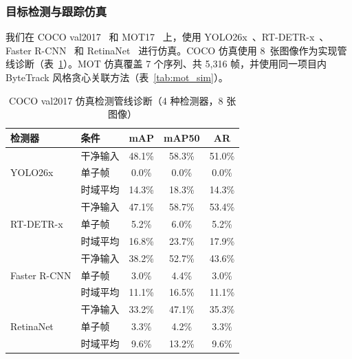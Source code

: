 \documentclass{ieeeaccess}
\begin{document}
\subsubsection{目标检测与跟踪仿真}

我们在 COCO val2017~\cite{b_coco2014} 和 MOT17~\cite{b_mot16} 上，使用 YOLO26x~\cite{b_yolo26}、RT-DETR-x~\cite{b_rtdetr2024}、Faster R-CNN~\cite{b_fasterrcnn2015} 和 RetinaNet~\cite{b_retinanet2017} 进行仿真。COCO 仿真使用 8~张图像作为实现管线诊断（表~\ref{tab:coco_sim}）。MOT 仿真覆盖 7 个序列、共 5,316 帧，并使用同一项目内 ByteTrack 风格贪心关联方法（表~\ref{tab:mot_sim}）。

\begin{table}[!t]
\caption{COCO val2017 仿真检测管线诊断（4 种检测器，8 张图像）}
\label{tab:coco_sim}
\centering
\footnotesize
\setlength{\tabcolsep}{5.8pt}
\begin{tabular}{llccc}
\toprule
检测器 & 条件 & mAP & mAP50 & AR \\
\midrule
\multirow{3}{*}{YOLO26x}
 & 干净输入 & 48.1\% & 58.3\% & 51.0\% \\
 & 单子帧 & 0.0\% & 0.0\% & 0.0\% \\
 & 时域平均 & 14.3\% & 18.3\% & 14.3\% \\
\midrule
\multirow{3}{*}{RT-DETR-x}
 & 干净输入 & 47.1\% & 58.7\% & 53.4\% \\
 & 单子帧 & 5.2\% & 6.0\% & 5.2\% \\
 & 时域平均 & 16.8\% & 23.7\% & 17.9\% \\
\midrule
\multirow{3}{*}{Faster R-CNN}
 & 干净输入 & 38.2\% & 52.7\% & 43.6\% \\
 & 单子帧 & 3.0\% & 4.4\% & 3.0\% \\
 & 时域平均 & 11.1\% & 16.5\% & 11.1\% \\
\midrule
\multirow{3}{*}{RetinaNet}
 & 干净输入 & 33.2\% & 47.1\% & 35.3\% \\
 & 单子帧 & 3.3\% & 4.2\% & 3.3\% \\
 & 时域平均 & 9.6\% & 13.2\% & 9.6\% \\
\bottomrule
\end{tabular}
\end{table}
\end{document}
